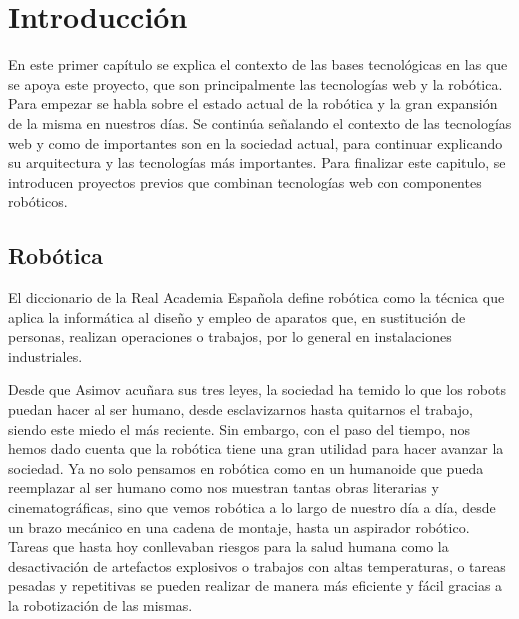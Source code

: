 \chapter{Introducción}\label{cap.introduccion}
En este primer capítulo se explica el contexto de las bases tecnológicas en las que se apoya este proyecto, que son principalmente las tecnologías web y la robótica. Para empezar se habla sobre el estado actual de la robótica y la gran expansión de la misma en nuestros días. Se continúa señalando el contexto de las tecnologías web y como de importantes son en la sociedad actual, para continuar explicando su arquitectura y las tecnologías más importantes. Para finalizar este capitulo, se introducen proyectos previos que combinan tecnologías web con componentes robóticos.

\section{Robótica}
El diccionario de la Real Academia Española define robótica como la técnica que aplica la informática al diseño y empleo de aparatos que, en sustitución de personas, realizan operaciones o trabajos, por lo general en instalaciones industriales. 

Desde que Asimov acuñara sus tres leyes, la sociedad ha temido lo que los robots puedan hacer al ser humano, desde esclavizarnos hasta quitarnos el trabajo, siendo este miedo el más reciente. Sin embargo, con el paso del tiempo, nos hemos dado cuenta que la robótica tiene una gran utilidad para hacer avanzar la sociedad. Ya no solo pensamos en robótica como en un humanoide que pueda reemplazar al ser humano como nos muestran tantas obras literarias y cinematográficas, sino que vemos robótica a lo largo de nuestro día a día, desde un brazo mecánico en una cadena de montaje, hasta un aspirador robótico. Tareas que hasta hoy conllevaban riesgos para la salud humana como la desactivación de artefactos explosivos o trabajos con altas temperaturas, o tareas pesadas y repetitivas se pueden realizar de manera más eficiente y fácil gracias a la robotización de las mismas.

